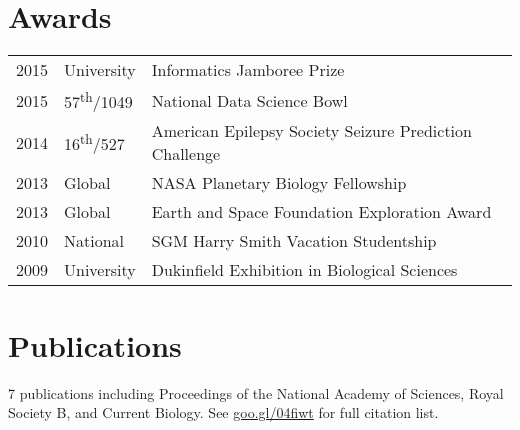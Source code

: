 \documentclass[]{Finlay_Maguire_CV}
\begin{document}
\begin{minipage}[t]{0.66\textwidth}
\section{Awards} 
\begin{tabular}{rll}
2015	     & University  & Informatics Jamboree Prize \\
2015         & 57\textsuperscript{th}/1049 & National Data Science Bowl\\
2014         & 16\textsuperscript{th}/527 & American Epilepsy Society Seizure Prediction Challenge \\
2013	     & Global & NASA Planetary Biology Fellowship \\
2013	     & Global & Earth and Space Foundation Exploration Award\\
2010     & National & SGM Harry Smith Vacation Studentship\\
2009     & University & Dukinfield Exhibition in Biological Sciences\\
\end{tabular}

\sectionsep


\section{Publications} 
%
%
7 publications including Proceedings of the National Academy of Sciences, Royal Society B, and Current Biology.
See \url{goo.gl/04fiwt} for full citation list.

\end{minipage}
\end{document}
